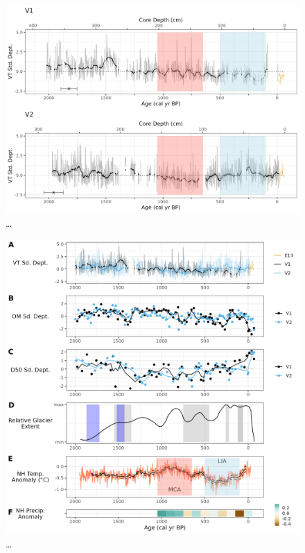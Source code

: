 \documentclass[
  letterpaper,
  DIV=11,
  numbers=noendperiod]{scrartcl}
\begin{document}
\begin{figure}

{\centering \includegraphics[width=1\textwidth,height=\textheight]{figs/V1_V2_varvethickness_vs_depth_and_C14_est_yr_ma.png}

}

\caption{\label{fig-varves-a}\ldots{}}

\end{figure}

\begin{figure}

{\centering \includegraphics[width=1\textwidth,height=\textheight]{figs/all_core_stats_2k_anomalies.jpg}

}

\caption{\label{fig-proxy-comparison}\ldots{}}

\end{figure}
\end{document}
